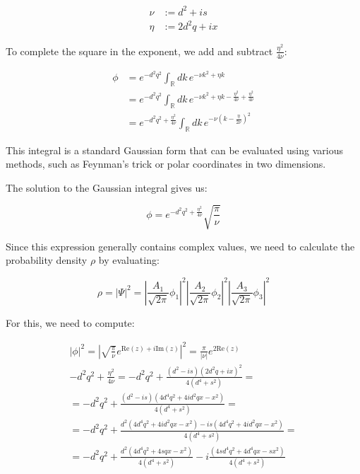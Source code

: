 \documentclass[italian]{HKNdocument}
\begin{document}
\begin{align*}
\nu &:= d^2+is \\
\eta &:= 2d^2q+ix \tag{3.15}
\end{align*}

To complete the square in the exponent, we add and subtract $\frac{\eta^2}{4\nu}$:

\begin{align*}
\phi &= e^{-d^2q^2}\int_{\mathbb{R}}dk\,e^{-\nu k^2+\eta k} \\
&= e^{-d^2q^2}\int_{\mathbb{R}}dk\,e^{-\nu k^2+\eta k-\frac{\eta^2}{4\nu}+\frac{\eta^2}{4\nu}} \tag{3.16} \\
&= e^{-d^2q^2+\frac{\eta^2}{4\nu}}\int_{\mathbb{R}}dk\,e^{-\nu\left(k-\frac{\eta}{2\nu}\right)^2}
\end{align*}

This integral is a standard Gaussian form that can be evaluated using various methods, such as Feynman's trick or polar coordinates in two dimensions.


The solution to the Gaussian integral gives us:

\begin{equation*}
\phi = e^{-d^2q^2+\frac{\eta^2}{4\nu}}\sqrt{\frac{\pi}{\nu}} \tag{3.17}
\end{equation*}

Since this expression generally contains complex values, we need to calculate the probability density $\rho$ by evaluating:

\begin{equation*}
\rho = |\Psi|^2 = \left|\frac{A_1}{\sqrt{2\pi}}\phi_1\right|^2\left|\frac{A_2}{\sqrt{2\pi}}\phi_2\right|^2\left|\frac{A_3}{\sqrt{2\pi}}\phi_3\right|^2 \tag{3.18}
\end{equation*}

For this, we need to compute:

\begin{gather*}
|\phi|^2 = \left|\sqrt{\frac{\pi}{\nu}}e^{\text{Re}(z)+i\text{Im}(z)}\right|^2 = \frac{\pi}{|\nu|}e^{2\text{Re}(z)} \tag{3.19} \\
-d^2q^2+\frac{\eta^2}{4\nu} = -d^2q^2+\frac{(d^2-is)(2d^2q+ix)^2}{4(d^4+s^2)} = \\
= -d^2q^2+\frac{(d^2-is)(4d^4q^2+4id^2qx-x^2)}{4(d^4+s^2)} = \\
= -d^2q^2+\frac{d^2(4d^4q^2+4id^2qx-x^2)-is(4d^4q^2+4id^2qx-x^2)}{4(d^4+s^2)} = \tag{3.20} \\
= -d^2q^2+\frac{d^2(4d^4q^2+4sqx-x^2)}{4(d^4+s^2)}-i\frac{(4sd^4q^2+4d^4qx-sx^2)}{4(d^4+s^2)}
\end{gather*}
\end{document}

